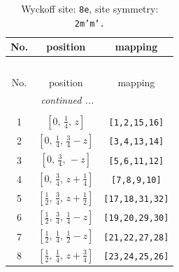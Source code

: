 \documentclass[fleqn,8pt]{jsarticle}
\begin{document}
\begin{longtable}{ccc}
\caption{Wyckoff site: {\tt 8e}, site symmetry: {\tt 2m'm'.}}
 \\
 \hline \hline
No. & position & mapping \\ \hline \endfirsthead

\multicolumn{2}{l}{\tablename\ \thetable{}} \\
 \hline \hline
No. & position & mapping \\ \hline \endhead

 \hline \hline
\multicolumn{2}{r}{\footnotesize\it continued ...} \\ \endfoot

 \hline \hline
\multicolumn{2}{r}{} \\ \endlastfoot

1 & $\left[ 0,\, \frac{1}{4},\, z \right]$ & {\tt [1,2,15,16]} \\ \hline
2 & $\left[ 0,\, \frac{1}{4},\, \frac{3}{4} - z \right]$ & {\tt [3,4,13,14]} \\ \hline
3 & $\left[ 0,\, \frac{3}{4},\, - z \right]$ & {\tt [5,6,11,12]} \\ \hline
4 & $\left[ 0,\, \frac{3}{4},\, z + \frac{1}{4} \right]$ & {\tt [7,8,9,10]} \\ \hline
5 & $\left[ \frac{1}{2},\, \frac{3}{4},\, z + \frac{1}{2} \right]$ & {\tt [17,18,31,32]} \\ \hline
6 & $\left[ \frac{1}{2},\, \frac{3}{4},\, \frac{1}{4} - z \right]$ & {\tt [19,20,29,30]} \\ \hline
7 & $\left[ \frac{1}{2},\, \frac{1}{4},\, \frac{1}{2} - z \right]$ & {\tt [21,22,27,28]} \\ \hline
8 & $\left[ \frac{1}{2},\, \frac{1}{4},\, z + \frac{3}{4} \right]$ & {\tt [23,24,25,26]} \\
\end{longtable}
\renewcommand{\arraystretch}{1.2}
\end{document}
